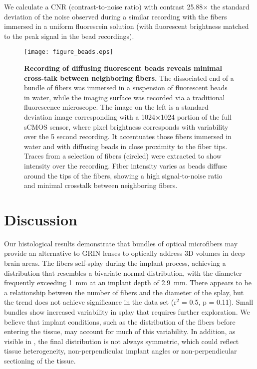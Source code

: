 We calculate a CNR (contrast-to-noise ratio) with contrast 
25.88$\times$ the standard deviation of the noise observed during 
a similar recording with the fibers immersed in a uniform 
fluorescein solution (with fluorescent brightness matched to the 
peak signal in the bead recordings).

\begin{figure}
\texttt{[image: figure\_beads.eps]}
\caption[Recording of diffusing fluorescent beads 
via fiber bundle.]{\textbf{Recording of diffusing fluorescent 
beads reveals minimal cross-talk between neighboring 
fibers.} The dissociated 
end of a bundle of fibers was immersed in a 
suspension of fluorescent beads in water, while the 
imaging surface was recorded via a traditional 
fluorescence microscope. The image on the left is 
a standard deviation image corresponding with a 
1024$\times$1024 portion of the full sCMOS sensor, 
where pixel brightness corresponds with variability 
over the 5 second recording. It accentuates those 
fibers immersed in water and with diffusing beads 
in close proximity to the fiber tips. Traces from 
a selection of fibers (circled) were extracted to 
show intensity over the recording. Fiber intensity 
varies as beads diffuse around the tips of the 
fibers, showing a high signal-to-noise ratio and 
minimal crosstalk between neighboring fibers.}
\label{fig:beads}
\end{figure}

\section{Discussion}

Our histological results demonstrate that bundles of optical 
microfibers may provide an alternative to GRIN lenses to 
optically address 3D volumes in deep brain areas. The 
fibers self-splay during the implant process, achieving 
a distribution that resembles a bivariate normal distribution, 
with the diameter frequently exceeding 1~mm at an implant 
depth of 2.9~mm. There appears to be a relationship between 
the number of fibers and the diameter of the splay, but the 
trend does not achieve significance in the data set 
(r$^2$ = 0.5, p = 0.11). Small bundles show increased 
variability in splay that requires further exploration. We 
believe that implant conditions, such as the distribution of 
the fibers before entering the tissue, may account for much 
of this variability. In addition, as visible in 
, the final distribution is not 
always symmetric, which could reflect tissue heterogeneity, 
non-perpendicular implant angles or non-perpendicular 
sectioning of the tissue. 

